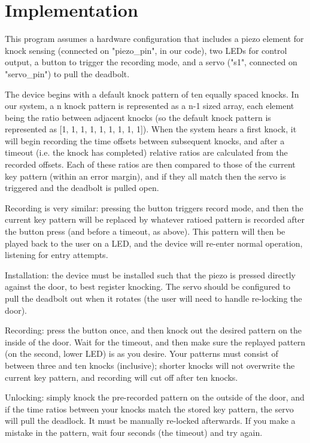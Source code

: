 \documentclass[11pt]{article}			%
\begin{document}
\section{Implementation}

This program assumes a hardware configuration that includes a piezo element for knock sensing (connected on "piezo\_pin", in our code), two LEDs for control output, a button to trigger the recording mode, and a servo ("s1", connected on "servo\_pin") to pull the deadbolt.

The device begins with a default knock pattern of ten equally spaced knocks. In our system, a n knock pattern is represented as a n-1 sized array, each element being the ratio between adjacent knocks (so the default knock pattern is represented as [1, 1, 1, 1, 1, 1, 1, 1, 1]). When the system hears a first knock, it will begin recording the time offsets between subsequent knocks, and after a timeout (i.e. the knock has completed) relative ratios are calculated from the recorded offsets. Each of these ratios are then compared to those of the current key pattern (within an error margin), and if they all match then the servo is triggered and the deadbolt is pulled open.

Recording is very similar: pressing the button triggers record mode, and then the current key pattern will be replaced by whatever ratioed pattern is recorded after the button press (and before a timeout, as above). This pattern will then be played back to the user on a LED, and the device will re-enter normal operation, listening for entry attempts.

Installation: the device must be installed such that the piezo is pressed directly against the door, to best register knocking. The servo should be configured to pull the deadbolt out when it rotates (the user will need to handle re-locking the door).

Recording: press the button once, and then knock out the desired pattern on the inside of the door. Wait for the timeout, and then make sure the replayed pattern (on the second, lower LED) is as you desire. Your patterns must consist of between three and ten knocks (inclusive); shorter knocks will not overwrite the current key pattern, and recording will cut off after ten knocks.

Unlocking: simply knock the pre-recorded pattern on the outside of the door, and if the time ratios between your knocks match the stored key pattern, the servo will pull the deadlock. It must be manually re-locked afterwards. If you make a mistake in the pattern, wait four seconds (the timeout) and try again.
\end{document}
